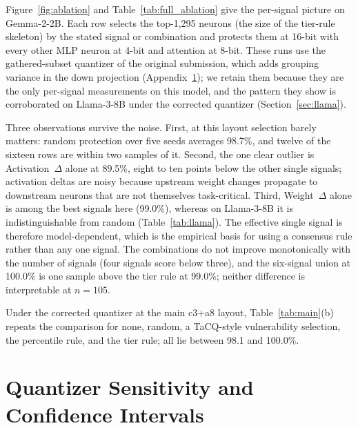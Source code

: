 \documentclass[11pt]{article}
\begin{document}
Figure~\ref{fig:ablation} and Table~\ref{tab:full_ablation} 
give the per-signal picture on Gemma-2-2B. Each row selects 
the top-1,295 neurons (the size of the tier-rule skeleton) by 
the stated signal or combination and protects them at 16-bit 
with every other MLP neuron at 4-bit and attention at 8-bit. 
These runs use the gathered-subset quantizer of the original 
submission, which adds grouping variance in the down 
projection (Appendix~\ref{app:reliability}); we retain them 
because they are the only per-signal measurements on this 
model, and the pattern they show is corroborated on Llama-3-8B 
under the corrected quantizer (Section~\ref{sec:llama}).

Three observations survive the noise. First, at this layout 
selection barely matters: random protection over five seeds 
averages 98.7\%, and twelve of the sixteen rows are within two 
samples of it. Second, the one clear outlier is 
Activation~$\Delta$ alone at 89.5\%, eight to ten points below 
the other single signals; activation deltas are noisy because upstream weight changes propagate to downstream neurons that are not themselves 
task-critical. Third, Weight~$\Delta$ alone is among the best 
signals here (99.0\%), whereas on Llama-3-8B it is 
indistinguishable from random (Table~\ref{tab:llama}). The 
effective single signal is therefore model-dependent, which is 
the empirical basis for using a consensus rule rather than any 
one signal. The combinations do not improve monotonically with 
the number of signals (four signals score below three), and the 
six-signal union at 100.0\% is one sample above the tier rule 
at 99.0\%; neither difference is interpretable at $n{=}105$.

Under the corrected quantizer at the main c3+a8 layout, 
Table~\ref{tab:main}(b) repeats the comparison for none, 
random, a TaCQ-style vulnerability selection, the percentile 
rule, and the tier rule; all lie between 98.1 and 100.0\%.


\section{Quantizer Sensitivity and Confidence Intervals}
\label{app:reliability}
\end{document}
